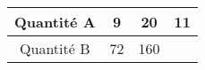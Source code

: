 \begin{tabular}{|c|c|c|c|}
\hline
Quantité A & 9 & 20 & 11 \\ \hline
Quantité B & 72 & 160 & \kern1cm \\ \hline
\end{tabular}

